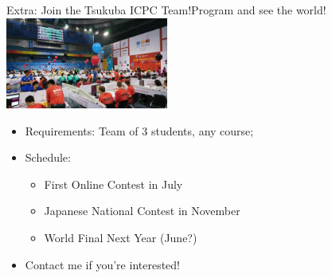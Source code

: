 \begin{frame}{Extra: Join the Tsukuba ICPC Team!}{Program and see the world!}
  \hfill \includegraphics[width=0.4\textwidth]{img/icpc_image1}
  \begin{itemize}
    \item \alert{Requirements}: Team of 3 students, any course;
    \medskip

    \item \alert{Schedule:}
    \begin{itemize}
      \item First Online Contest in July
      \item Japanese National Contest in November
      \item World Final Next Year (June?)
    \end{itemize}
    \medskip
    \item Contact me if you're interested!
  \end{itemize}
\end{frame}



